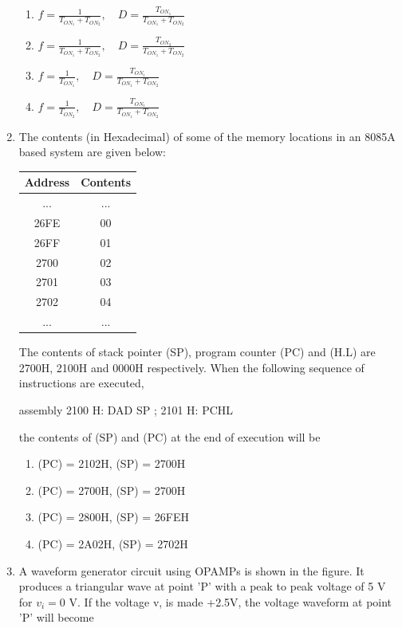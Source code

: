 \documentclass{article}
\begin{document}
\begin{enumerate}
    \begin{enumerate}
            \item $f = \frac{1}{T_{ON_1} + T_{ON_2}}, \quad D = \frac{T_{ON_1}}{T_{ON_1} + T_{ON_2}}$
            \item $f = \frac{1}{T_{ON_1} + T_{ON_2}}, \quad D = \frac{T_{ON_2}}{T_{ON_1} + T_{ON_2}}$
            \item $f = \frac{1}{T_{ON_1}}, \quad D = \frac{T_{ON_1}}{T_{ON_1} + T_{ON_2}}$
            \item $f = \frac{1}{T_{ON_2}}, \quad D = \frac{T_{ON_1}}{T_{ON_1} + T_{ON_2}}$
        \end{enumerate}

    \item The contents (in Hexadecimal) of some of the memory locations in an 8085A based system are given below:

    \begin{tabular}{|c|c|}
        \hline
        Address & Contents \\
        \hline
        ... & ... \\
        26FE & 00 \\
        26FF & 01 \\
        2700 & 02 \\
        2701 & 03 \\
        2702 & 04 \\
        ... & ... \\
        \hline
    \end{tabular}

    The contents of stack pointer (SP), program counter (PC) and (H.L) are 2700H, 2100H and 0000H respectively. When the following sequence of instructions  
 are executed,

    assembly
    2100 H:  DAD SP ;
    2101 H:  PCHL
    

    the contents of (SP) and (PC) at the end of execution will be
        \begin{enumerate}
            \item (PC) = 2102H, (SP) = 2700H
            \item (PC) = 2700H, (SP) = 2700H
            \item (PC) = 2800H, (SP) = 26FEH
            \item (PC) = 2A02H, (SP) = 2702H
        \end{enumerate}

     \item A waveform generator circuit using OPAMPs is shown in the figure. It produces a triangular wave at point 'P' with a peak to peak voltage  
        of 5 V for $v_i = 0$ V. If the voltage v, is made +2.5V, the voltage waveform at point 'P' will become


\end{enumerate}
\end{document}
